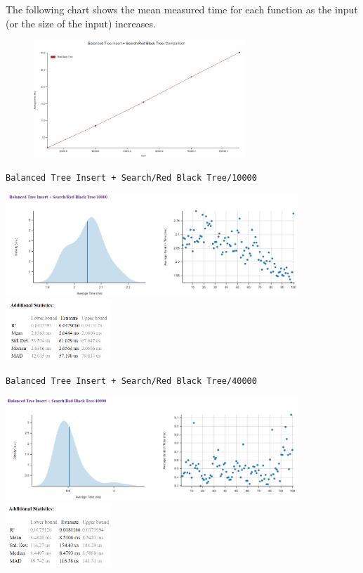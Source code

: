 \documentclass[11pt, letterpaper]{article}
\begin{document}
The following chart shows the mean measured time for each function as the input (or the size of the input) increases. \\

\begin{figure}[htbp]
    \centering
    \includegraphics[width=8cm]{benchmarks/Red_black_tree/line.png}
    \label{Line}
\end{figure}

\texttt{Balanced Tree Insert + Search/Red Black Tree/10000}
\begin{paracol}{3}
    \centering        
    \includegraphics[width=11cm]{benchmarks/Red_black_tree/10000/plots.png}
    \switchcolumn
    \vspace*{\fill}
    \includegraphics[width=4cm]{benchmarks/Red_black_tree/10000/stats.png}
    \vspace*{\fill}
\end{paracol}

\texttt{Balanced Tree Insert + Search/Red Black Tree/40000}
\begin{paracol}{3}
    \centering        
    \includegraphics[width=11cm]{benchmarks/Red_black_tree/40000/plots.png}
    \switchcolumn
    \vspace*{\fill}
    \includegraphics[width=4cm]{benchmarks/Red_black_tree/40000/stats.png}
    \vspace*{\fill}
\end{paracol}
\end{document}
